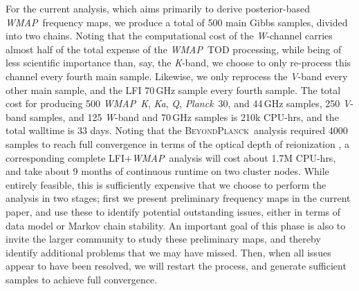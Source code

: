 \documentclass[twocolumn]{../../common/aa}
\def\WMAP{\emph{WMAP}}
\def\Planck{\emph{Planck}}
\newcommand{\bp}{\textsc{BeyondPlanck}}
\newcommand{\K}[0]{\textit K}
\newcommand{\Ka}[0]{\textit{Ka}}
\newcommand{\Q}[0]{\textit Q}
\newcommand{\V}[0]{\textit V}
\newcommand{\W}[0]{\textit W}
\begin{document}
For the current analysis, which aims primarily to derive posterior-based \WMAP\ frequency maps, we produce a total of 500 main Gibbs samples, divided into two chains. Noting that the computational cost of the \W-channel carries almost half of the total expense of the \WMAP\ TOD processing, while being of less scientific importance than, say, the \K-band, we choose to only re-process this channel every fourth main sample. Likewise, we only reprocess the \V-band every other main sample, and the LFI 70\,GHz sample every fourth sample. The total cost for producing 500 \WMAP\ \K, \Ka, \Q, \Planck\ 30, and 44\,GHz samples, 250 \V-band samples, and 125 \W-band and 70\,GHz samples is 210k CPU-hrs, and the total walltime is 33 days. Noting that the \bp\ analysis required 4000 samples to reach full convergence in terms of the optical depth of reionization \citep{bp12}, a corresponding complete LFI+\WMAP\ analysis will cost about 1.7M CPU-hrs, and take about 9 months of continuous runtime on two cluster nodes. While entirely feasible, this is sufficiently expensive that we choose to perform the analysis in two stages; first we present preliminary frequency maps in the current paper, and use these to identify potential outstanding issues, either in terms of data model or Markov chain stability. An important goal of this phase is also to invite the larger community to study these preliminary maps, and thereby identify additional problems that we may have missed. Then, when all issues appear to have been resolved, we will restart the process, and generate sufficient samples to achieve full convergence.











\end{document}

